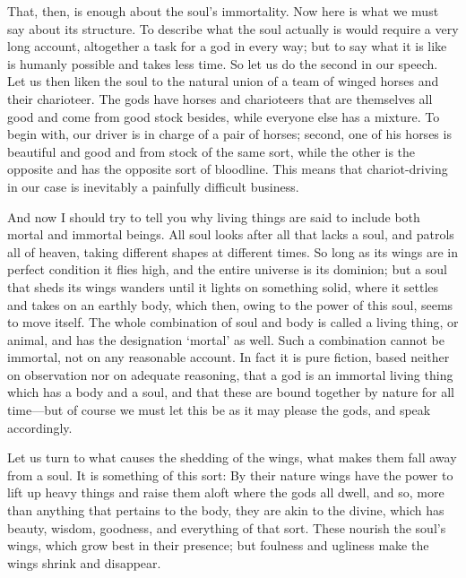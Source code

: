 That, then, is enough about the soul’s immortality. Now
here is what we must say about its structure. To describe what the soul
actually is would require a very long account, altogether a task for a
god in every way; but to say what it is like is humanly possible and
takes less time. So let us do the second in our speech. Let us then
liken the soul to the natural union of a team of winged horses and their
charioteer. The gods have horses and charioteers that are themselves all
good and come from good stock besides, while everyone else has a
mixture. To begin with, our driver is in charge of a pair of horses;
second, one of his horses is beautiful and good and from stock of the
same sort, while the other is the opposite and has the opposite sort of
bloodline. This means that chariot-driving in our case is inevitably a
painfully difficult business.

And now I should try to tell you why living things are said to include
both mortal and immortal beings. All soul looks after all that lacks a
soul, and patrols all of heaven, taking different shapes at
different times. So long as its wings are in perfect condition it flies
high, and the entire universe is its dominion; but a soul that sheds its
wings wanders until it lights on something solid, where it settles and
takes on an earthly body, which then, owing to the power of this soul,
seems to move itself. The whole combination of soul and body is called a
living thing, or animal, and has the designation ‘mortal’ as well. Such
a combination cannot be immortal, not on any reasonable account. In fact
it is pure fiction, based neither on observation nor on adequate
reasoning, that a god is an immortal living thing which has a body and a
soul, and that these are bound together by nature for all time---but of
course we must let this be as it may please the gods, and speak
accordingly.

Let us turn to what causes the shedding of the wings, what makes them
fall away from a soul. It is something of this sort: By their nature
wings have the power to lift up heavy things and raise them aloft where
the gods all dwell, and so, more than anything that pertains to the
body, they are akin to the divine, which has beauty, wisdom, goodness,
and everything of that sort. These nourish the soul’s wings,
which grow best in their presence; but foulness and ugliness make the
wings shrink and disappear.

